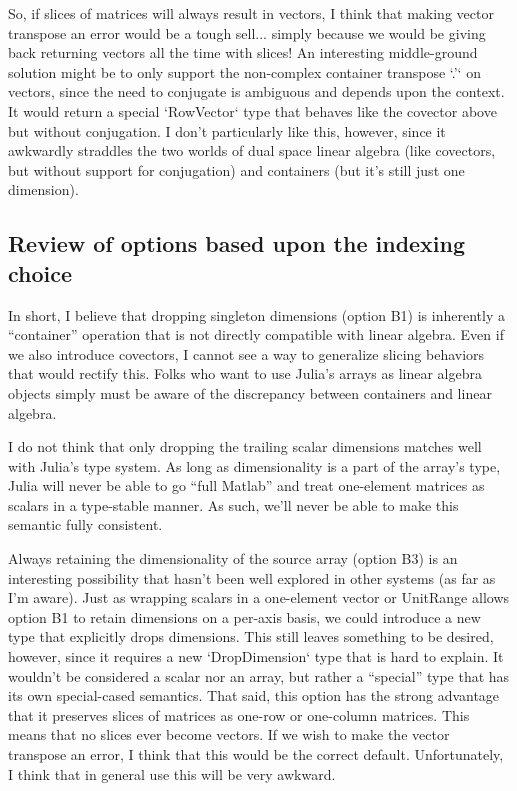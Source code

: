 So, if slices of matrices will always result in vectors, I think that making
vector transpose an error would be a tough sell... simply because we would be
giving back returning vectors all the time with slices! An interesting
middle-ground solution might be to only support the non-complex container
transpose `.'` on vectors, since the need to conjugate is ambiguous and depends
upon the context. It would return a special `RowVector` type that behaves like
the covector above but without conjugation. I don't particularly like this,
however, since it awkwardly straddles the two worlds of dual space linear
algebra (like covectors, but without support for conjugation) and containers
(but it's still just one dimension).

\subsection{Review of options based upon the indexing choice}

In short, I believe that dropping singleton dimensions (option B1) is
inherently a ``container'' operation that is not directly compatible with linear
algebra. Even if we also introduce covectors, I cannot see a way to generalize
slicing behaviors that would rectify this. Folks who want to use Julia's arrays
as linear algebra objects simply must be aware of the discrepancy between
containers and linear algebra.

I do not think that only dropping the trailing scalar dimensions matches well
with Julia's type system. As long as dimensionality is a part of the array's
type, Julia will never be able to go ``full Matlab'' and treat one-element
matrices as scalars in a type-stable manner. As such, we'll never be able to
make this semantic fully consistent.

Always retaining the dimensionality of the source array (option B3) is an
interesting possibility that hasn't been well explored in other systems (as far
as I'm aware). Just as wrapping scalars in a one-element vector or UnitRange
allows option B1 to retain dimensions on a per-axis basis, we could introduce a
new type that explicitly drops dimensions. This still leaves something to be
desired, however, since it requires a new `DropDimension` type that is hard to
explain. It wouldn't be considered a scalar nor an array, but rather a
``special'' type that has its own special-cased semantics. That said, this option
has the strong advantage that it preserves slices of matrices as one-row or
one-column matrices. This means that no slices ever become vectors. If we wish
to make the vector transpose an error, I think that this would be the correct
default. Unfortunately, I think that in general use this will be very awkward.

